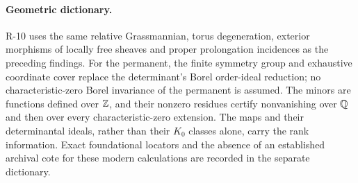 \paragraph{Geometric dictionary.}
R-10 uses the same relative Grassmannian, torus degeneration,
exterior morphisms of locally free sheaves and proper
prolongation incidences as the preceding findings. For the
permanent, the finite symmetry group and exhaustive coordinate
cover replace the determinant's Borel order-ideal reduction;
no characteristic-zero Borel invariance of the permanent is
assumed. The minors are functions defined over $\mathbb Z$, and their
nonzero residues certify nonvanishing over $\mathbb Q$ and then over
every characteristic-zero extension. The maps and their
determinantal ideals, rather than their $K_0$ classes alone,
carry the rank information. Exact foundational locators and
the absence of an established archival cote for these modern
calculations are recorded in the separate dictionary.
